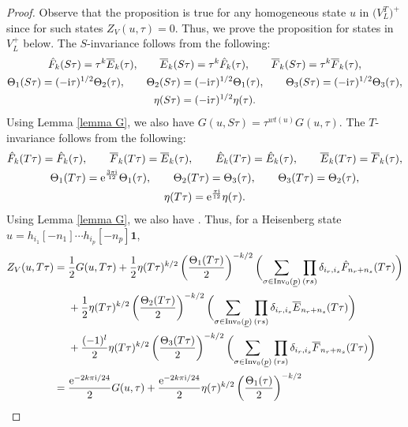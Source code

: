 \documentclass[pdftex]{sigma}
\numberwithin{equation}{section}
\theoremstyle{definition}
\begin{document}
\begin{proof}
 Observe that the proposition is true for any homogeneous state $u$ in $\bigl(V_L^T\bigr)^+$ since for such states $Z_V(u,\tau)=0$. Thus, we prove the proposition for states in $V_L^+$ below.
 The $S$-invariance follows from the following:
 \begin{gather*}
 \hat{F}_k(S\tau)=\tau^k\overline{E}_k(\tau), \qquad \overline{E}_k(S\tau)=\tau^k\hat{F}_k(\tau), \qquad \overline{F}_k(S\tau)=\tau^k\overline{F}_k(\tau),\\
\Theta_1(S\tau)=(-{\rm i}\tau)^{1/2}\Theta_2(\tau), \qquad \Theta_2(S\tau)=(-{\rm i}\tau)^{1/2}\Theta_1(\tau), \qquad \Theta_3(S\tau)=(-{\rm i}\tau)^{1/2}\Theta_3(\tau),\\
\eta(S\tau)=(-{\rm i}\tau)^{1/2}\eta(\tau).\end{gather*}
Using Lemma \ref{lemma G}, we also have
$G(u,S\tau)=\tau^{wt(u)}G(u,\tau)$.
The $T$-invariance follows from the following:
 \begin{gather*}
 \hat{F}_k(T\tau)=\hat{F}_k(\tau), \qquad \overline{F}_k(T\tau)=\overline{E}_k(\tau),\qquad
 \hat{E}_k(T\tau)=\hat{E}_k(\tau), \qquad \overline{E}_k(T\tau)=\overline{F}_k(\tau),\\
 \Theta_1(T\tau)={\rm e}^{\frac{3\pi {\rm i}}{12}}\Theta_1(\tau), \qquad \Theta_2(T\tau)=\Theta_3(\tau), \qquad \Theta_3(T\tau)=\Theta_2(\tau),\\
 \eta(T\tau)={\rm e}^{\frac{\pi {\rm i}}{12}}\eta(\tau).\end{gather*}
 Using Lemma \ref{lemma G}, we also have
 .
 Thus, for a Heisenberg state $u=h_{i_1}[-n_1]\cdots h_{i_p}[-n_p]\mathbf{1}$,
 \begin{align*}
 Z_V(u,T\tau)={}&\frac{1}{2}G(u,T\tau)+\frac{1}{2}\eta(T\tau)^{k/2}\left(\frac{\Theta_1(T\tau)}{2}\right)^{-k/2}\biggl(\sum_{\sigma\in \operatorname{Inv}_0(\underline{p})} \prod_{(rs)}\delta_{i_r,i_s}\hat{F}_{n_r+n_s}(T\tau) \biggr)\\
 &+\frac{1}{2}\eta(T\tau)^{k/2}\left(\frac{\Theta_2(T\tau)}{2}\right)^{-k/2}\biggl(\sum_{\sigma\in \operatorname{Inv}_0(\underline{p})}\prod_{(rs)}\delta_{i_r,i_s}\overline{E}_{n_r+n_s}(T\tau)\biggr)\\
 &+\frac{(-1)^l}{2}\eta(T\tau)^{k/2}\left(\frac{\Theta_3(T\tau)}{2}\right)^{-k/2}\biggl(\sum_{\sigma\in \operatorname{Inv}_0(\underline{p})}\prod_{(rs)}\delta_{i_r,i_s}\overline{F}_{n_r+n_s}(T\tau)\biggr)\\
 ={}&\frac{{\rm e}^{-2k\pi {\rm i}/24}}{2}G(u,\tau)+\frac{{\rm e}^{-2k\pi {\rm i}/24}}{2}\eta(\tau)^{k/2}\left(\frac{\Theta_1(\tau)}{2}\right)^{-k/2}\\

\end{align*}
\end{proof}
\end{document}

